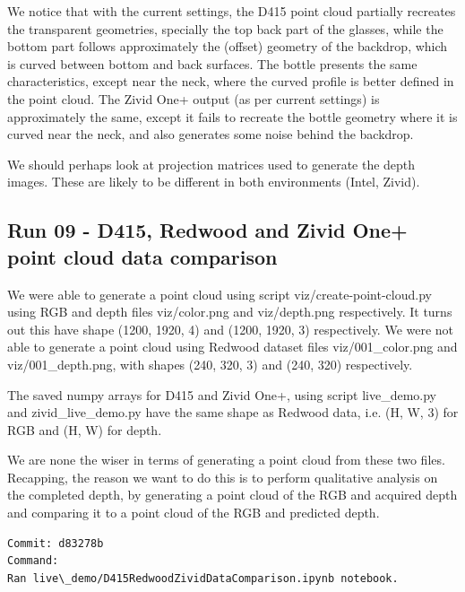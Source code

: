 We notice that with the current settings, the D415 point cloud partially recreates the transparent geometries, specially the top back part of the glasses, while the bottom part follows approximately the (offset) geometry of the backdrop, which is curved between bottom and back surfaces. The bottle presents the same characteristics, except near the neck, where the curved profile is better defined in the point cloud. The Zivid One+ output (as per current settings) is approximately the same, except it fails to recreate the bottle geometry where it is curved near the neck, and also generates some noise behind the backdrop.

We should perhaps look at projection matrices used to generate the depth images. These are likely to be different in both environments (Intel, Zivid).

\subsection{Run 09 -  D415, Redwood and Zivid One+ point cloud data comparison}
\label{app_res:09}
We were able to generate a point cloud using script viz/create-point-cloud.py using RGB and depth files viz/color.png and viz/depth.png respectively. It turns out this have shape (1200, 1920, 4) and (1200, 1920, 3) respectively. We were not able to generate a point cloud using Redwood dataset files viz/001\_color.png and viz/001\_depth.png, with shapes (240, 320, 3) and (240, 320) respectively.

The saved numpy arrays for D415 and Zivid One+, using script live\_demo.py and zivid\_live\_demo.py have the same shape as Redwood data, i.e. (H, W, 3) for RGB and (H, W) for depth.

We are none the wiser in terms of generating a point cloud from these two files. Recapping, the reason we want to do this is to perform qualitative analysis on the completed depth, by generating a point cloud of the RGB and acquired depth and comparing it to a point cloud of the RGB and predicted depth.
\begin{verbatim}
Commit: d83278b
Command: 
Ran live\_demo/D415RedwoodZividDataComparison.ipynb notebook.
\end{verbatim}


